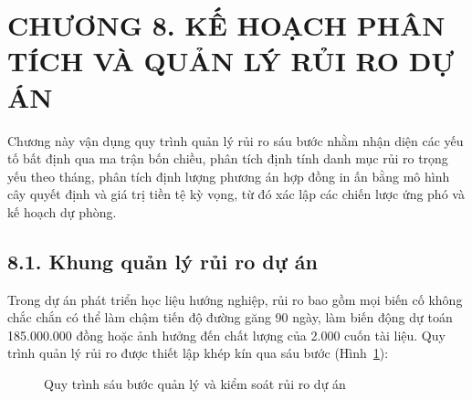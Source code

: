 \section{CHƯƠNG 8. KẾ HOẠCH PHÂN TÍCH VÀ QUẢN LÝ RỦI RO DỰ ÁN}

Chương này vận dụng quy trình quản lý rủi ro sáu bước nhằm nhận diện các yếu tố bất định qua ma trận bốn chiều, phân tích định tính danh mục rủi ro trọng yếu theo tháng, phân tích định lượng phương án hợp đồng in ấn bằng mô hình cây quyết định và giá trị tiền tệ kỳ vọng, từ đó xác lập các chiến lược ứng phó và kế hoạch dự phòng.

\subsection{8.1. Khung quản lý rủi ro dự án}

Trong dự án phát triển học liệu hướng nghiệp, rủi ro bao gồm mọi biến cố không chắc chắn có thể làm chậm tiến độ đường găng 90 ngày, làm biến động dự toán 185.000.000 đồng hoặc ảnh hưởng đến chất lượng của 2.000 cuốn tài liệu. Quy trình quản lý rủi ro được thiết lập khép kín qua sáu bước (Hình~\ref{fig:quy_trinh_rui_ro}):

\begin{figure}[htbp]
\centering
{}
\caption{Quy trình sáu bước quản lý và kiểm soát rủi ro dự án}
\label{fig:quy_trinh_rui_ro}
\end{figure}

